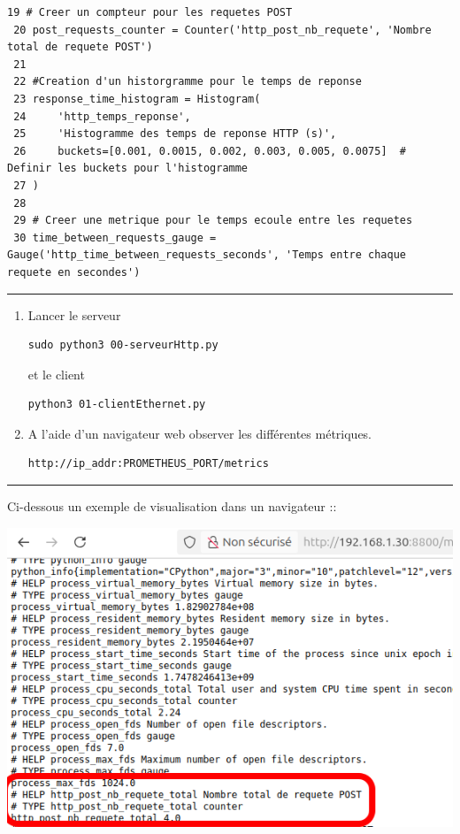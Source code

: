 \documentclass[french, 12pt]{article}%
\begin{document}
\begin{lstlisting}[style=commande]
 19 # Creer un compteur pour les requetes POST
 20 post_requests_counter = Counter('http_post_nb_requete', 'Nombre total de requete POST')
 21 
 22 #Creation d'un historgramme pour le temps de reponse
 23 response_time_histogram = Histogram(
 24     'http_temps_reponse',
 25     'Histogramme des temps de reponse HTTP (s)',
 26     buckets=[0.001, 0.0015, 0.002, 0.003, 0.005, 0.0075]  # Definir les buckets pour l'histogramme
 27 )
 28 
 29 # Creer une metrique pour le temps ecoule entre les requetes
 30 time_between_requests_gauge = Gauge('http_time_between_requests_seconds', 'Temps entre chaque requete en secondes')

\end{lstlisting}



\begin{center}
 \rule{0.75\linewidth}{1pt}
 \end{center}
\begin{enumerate}
\item Lancer le serveur 
\begin{lstlisting}[style=commande]
sudo python3 00-serveurHttp.py
\end{lstlisting}

et le client 
\begin{lstlisting}[style=commande]
python3 01-clientEthernet.py
\end{lstlisting}


\item A l'aide d'un navigateur web observer les différentes métriques. 

\begin{lstlisting}[style=commande]
http://ip_addr:PROMETHEUS_PORT/metrics
\end{lstlisting}

\end{enumerate}
\begin{center}
 \rule{0.75\linewidth}{1pt}
 \end{center}

Ci-dessous un exemple de visualisation dans un navigateur :: 
\begin{center}
\includegraphics[scale=0.7]{./ressource/exPromServerIot}
\end{center}
\end{document}

